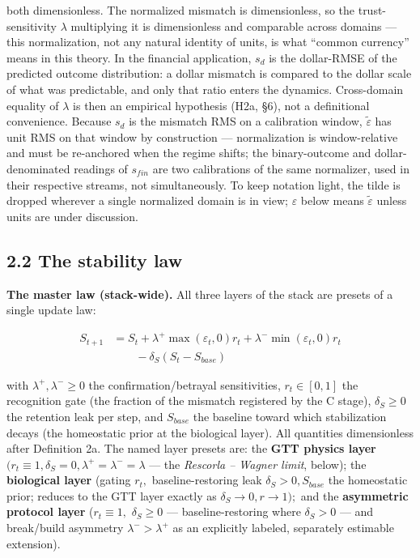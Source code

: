 \documentclass[
]{article}
\begin{document}
both dimensionless. The normalized mismatch is dimensionless, so the
trust-sensitivity \(\lambda\) multiplying it is dimensionless and
comparable across domains --- this normalization, not any natural
identity of units, is what ``common currency'' means in this theory. In
the financial application, \(s_d\) is the dollar-RMSE of the predicted
outcome distribution: a dollar mismatch is compared to the dollar scale
of what was predictable, and only that ratio enters the dynamics.
Cross-domain equality of \(\lambda\) is then an empirical hypothesis
(H2a, §6), not a definitional convenience. Because \(s_d\) is the
mismatch RMS on a calibration window, \(\tilde{\varepsilon}\) has unit
RMS on that window by construction --- normalization is window-relative
and must be re-anchored when the regime shifts; the binary-outcome and
dollar-denominated readings of \(s_{fin}\) are two calibrations of the
same normalizer, used in their respective streams, not simultaneously.
To keep notation light, the tilde is dropped wherever a single
normalized domain is in view; \(\varepsilon\) below means
\(\tilde{\varepsilon}\) unless units are under discussion.

\subsection{2.2 The stability law}\label{the-stability-law}

\textbf{The master law (stack-wide).} All three layers of the stack are
presets of a single update law:

\begin{equation}
\begin{split}
S_{t+1} &= S_t + \lambda^{+} \max(\varepsilon_t, 0) r_t + \lambda^{-} \min(\varepsilon_t, 0) r_t\\
&\qquad - \delta_S (S_t - S_{base})
\end{split}
\label{eq:masterlaw}
\end{equation}

with \(\lambda^{+}, \lambda^{-} \geq 0\) the confirmation/betrayal
sensitivities, \(r_t \in [0, 1]\) the recognition gate (the fraction of
the mismatch registered by the C stage), \(\delta_S \geq 0\) the
retention leak per step, and \(S_{base}\) the baseline toward which
stabilization decays (the homeostatic prior at the biological layer).
All quantities dimensionless after Definition 2a. The named layer
presets are: the \textbf{GTT physics layer}
\((r_t \equiv 1, \delta_S = 0, \lambda^{+} = \lambda^{-} = \lambda\) ---
the \emph{Rescorla -- Wagner limit}, below); the \textbf{biological
layer} (gating \(r_t,\) baseline-restoring leak
\(\delta_S > 0, S_{base}\) the homeostatic prior; reduces to the GTT
layer exactly as \(\delta_S \to 0, r \to 1);\) and the
\textbf{asymmetric protocol layer} (\(r_t \equiv 1,\)
\(\delta_S \geq 0\) --- baseline-restoring where \(\delta_S > 0\) ---
and break/build asymmetry \(\lambda^{-} > \lambda^{+}\) as an explicitly
labeled, separately estimable extension).
\end{document}

